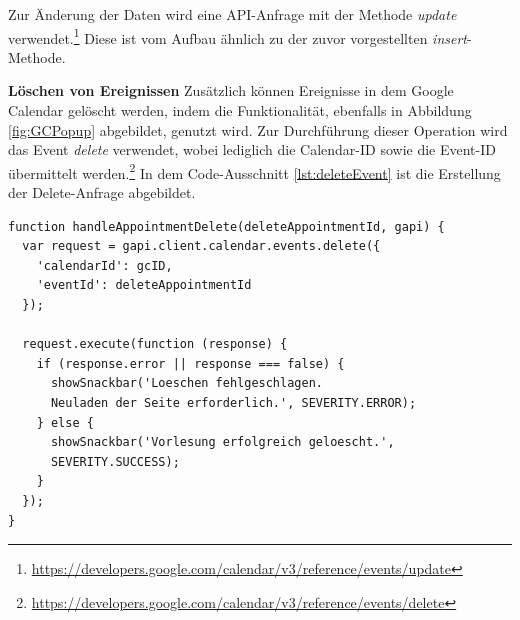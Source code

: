 Zur Änderung der Daten wird eine \ac{API}-Anfrage mit der Methode \textit{update} verwendet.\footnote{\url{https://developers.google.com/calendar/v3/reference/events/update}} 
Diese ist vom Aufbau ähnlich zu der zuvor vorgestellten \textit{insert}-Methode.

\textbf{Löschen von Ereignissen}\newline
Zusätzlich können Ereignisse in dem Google Calendar gelöscht werden, indem die Funktionalität, ebenfalls in Abbildung \vref{fig:GCPopup} abgebildet, genutzt wird. 
Zur Durchführung dieser Operation wird das Event \textit{delete} verwendet, wobei lediglich die Calendar-ID sowie die Event-ID übermittelt werden.\footnote{\url{https://developers.google.com/calendar/v3/reference/events/delete}}   
In dem Code-Ausschnitt \vref{lst:deleteEvent} ist die Erstellung der Delete-Anfrage abgebildet.

\lstset{language=JavaScript}
\begin{lstlisting}[caption={Anfrage zum Löschen eines Ereignisses}, label={lst:deleteEvent}]
function handleAppointmentDelete(deleteAppointmentId, gapi) {
  var request = gapi.client.calendar.events.delete({
    'calendarId': gcID,
    'eventId': deleteAppointmentId
  });

  request.execute(function (response) {
    if (response.error || response === false) {
      showSnackbar('Loeschen fehlgeschlagen. 
      Neuladen der Seite erforderlich.', SEVERITY.ERROR);
    } else {
      showSnackbar('Vorlesung erfolgreich geloescht.',
      SEVERITY.SUCCESS);
    }
  });
}
\end{lstlisting}

